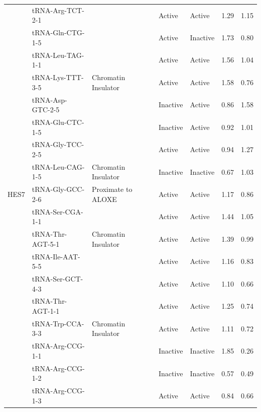 \documentclass[
  12pt,
]{article}
\begin{document}
\begin{longtable}[t]{lllllrr}
\endfoot
\bottomrule
\endlastfoot
 & tRNA-Arg-TCT-2-1 &  & Active & Active & 1.29 & 1.15\\
\nopagebreak
 & tRNA-Gln-CTG-1-5 &  & Active & Inactive & 1.73 & 0.80\\
\nopagebreak
 & tRNA-Leu-TAG-1-1 &  & Active & Active & 1.56 & 1.04\\
\nopagebreak
\multirow[t]{-4}{*}{\raggedright\arraybackslash ALOXE3} & tRNA-Lys-TTT-3-5 & \multirow[t]{-4}{*}{\raggedright\arraybackslash Chromatin Insulator} & Active & Active & 1.58 & 0.76\\
\cmidrule{1-7}\pagebreak[0]
 & tRNA-Asp-GTC-2-5 &  & Inactive & Active & 0.86 & 1.58\\
\nopagebreak
 & tRNA-Glu-CTC-1-5 &  & Inactive & Active & 0.92 & 1.01\\
\nopagebreak
 & tRNA-Gly-TCC-2-5 &  & Active & Active & 0.94 & 1.27\\
\nopagebreak
\multirow[t]{-4}{*}{\raggedright\arraybackslash Ebersole} & tRNA-Leu-CAG-1-5 & \multirow[t]{-4}{*}{\raggedright\arraybackslash Chromatin Insulator} & Inactive & Inactive & 0.67 & 1.03\\
\cmidrule{1-7}\pagebreak[0]
HES7 & tRNA-Gly-GCC-2-6 & Proximate to ALOXE & Active & Active & 1.17 & 0.86\\
\cmidrule{1-7}\pagebreak[0]
 & tRNA-Ser-CGA-1-1 &  & Active & Active & 1.44 & 1.05\\
\nopagebreak
\multirow[t]{-2}{*}{\raggedright\arraybackslash Per1} & tRNA-Thr-AGT-5-1 & \multirow[t]{-2}{*}{\raggedright\arraybackslash Chromatin Insulator} & Active & Active & 1.39 & 0.99\\
\cmidrule{1-7}\pagebreak[0]
 & tRNA-Ile-AAT-5-5 &  & Active & Active & 1.16 & 0.83\\
\nopagebreak
 & tRNA-Ser-GCT-4-3 &  & Active & Active & 1.10 & 0.66\\
\nopagebreak
 & tRNA-Thr-AGT-1-1 &  & Active & Active & 1.25 & 0.74\\
\nopagebreak
\multirow[t]{-4}{*}{\raggedright\arraybackslash TMEM107} & tRNA-Trp-CCA-3-3 & \multirow[t]{-4}{*}{\raggedright\arraybackslash Chromatin Insulator} & Active & Active & 1.11 & 0.72\\
\cmidrule{1-7}\pagebreak[0]
 & tRNA-Arg-CCG-1-1 &  & Inactive & Inactive & 1.85 & 0.26\\
\nopagebreak
 & tRNA-Arg-CCG-1-2 &  & Inactive & Inactive & 0.57 & 0.49\\
\nopagebreak
 & tRNA-Arg-CCG-1-3 &  & Active & Active & 0.84 & 0.66\\

\end{longtable}
\end{document}
